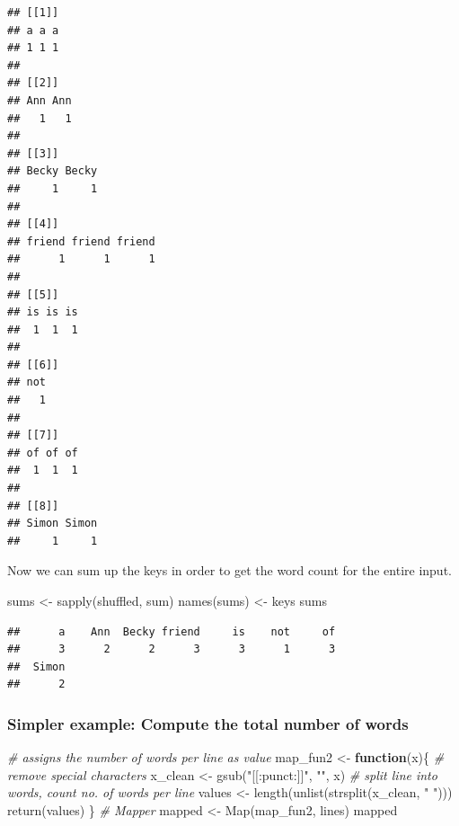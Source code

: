 \documentclass[
  12pt,
]{style/krantz}
\newenvironment{Shaded}{\begin{snugshade}}{\end{snugshade}}
\newcommand{\CommentTok}[1]{\textcolor[rgb]{0.56,0.35,0.01}{\textit{#1}}}
\newcommand{\ControlFlowTok}[1]{\textcolor[rgb]{0.13,0.29,0.53}{\textbf{#1}}}
\newcommand{\FunctionTok}[1]{\textcolor[rgb]{0.00,0.00,0.00}{#1}}
\newcommand{\NormalTok}[1]{#1}
\newcommand{\OtherTok}[1]{\textcolor[rgb]{0.56,0.35,0.01}{#1}}
\newcommand{\StringTok}[1]{\textcolor[rgb]{0.31,0.60,0.02}{#1}}
\begin{document}
\begin{verbatim}
## [[1]]
## a a a 
## 1 1 1 
## 
## [[2]]
## Ann Ann 
##   1   1 
## 
## [[3]]
## Becky Becky 
##     1     1 
## 
## [[4]]
## friend friend friend 
##      1      1      1 
## 
## [[5]]
## is is is 
##  1  1  1 
## 
## [[6]]
## not 
##   1 
## 
## [[7]]
## of of of 
##  1  1  1 
## 
## [[8]]
## Simon Simon 
##     1     1
\end{verbatim}

Now we can sum up the keys in order to get the word count for the entire input.

\begin{Shaded}
\begin{Highlighting}[]
\NormalTok{sums }\OtherTok{\textless{}{-}} \FunctionTok{sapply}\NormalTok{(shuffled, sum)}
\FunctionTok{names}\NormalTok{(sums) }\OtherTok{\textless{}{-}}\NormalTok{ keys}
\NormalTok{sums}
\end{Highlighting}
\end{Shaded}

\begin{verbatim}
##      a    Ann  Becky friend     is    not     of 
##      3      2      2      3      3      1      3 
##  Simon 
##      2
\end{verbatim}

\hypertarget{simpler-example-compute-the-total-number-of-words}{%
\subsubsection{Simpler example: Compute the total number of words}\label{simpler-example-compute-the-total-number-of-words}}

\begin{Shaded}
\begin{Highlighting}[]
\CommentTok{\# assigns the number of words per line as value}
\NormalTok{map\_fun2 }\OtherTok{\textless{}{-}} 
     \ControlFlowTok{function}\NormalTok{(x)\{}
          \CommentTok{\# remove special characters}
\NormalTok{          x\_clean }\OtherTok{\textless{}{-}} \FunctionTok{gsub}\NormalTok{(}\StringTok{"[[:punct:]]"}\NormalTok{, }\StringTok{""}\NormalTok{, x)}
          \CommentTok{\# split line into words, count no. of words per line}
\NormalTok{          values }\OtherTok{\textless{}{-}} \FunctionTok{length}\NormalTok{(}\FunctionTok{unlist}\NormalTok{(}\FunctionTok{strsplit}\NormalTok{(x\_clean, }\StringTok{" "}\NormalTok{)))}
          \FunctionTok{return}\NormalTok{(values)}
\NormalTok{     \}}
\CommentTok{\# Mapper}
\NormalTok{mapped }\OtherTok{\textless{}{-}} \FunctionTok{Map}\NormalTok{(map\_fun2, lines)}
\NormalTok{mapped}
\end{Highlighting}
\end{Shaded}
\end{document}
